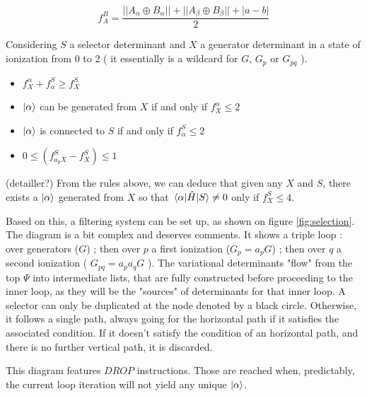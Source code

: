 \documentclass[./thesis.tex]{subfiles}
\begin{document}
\begin{equation}
f_A^B = \frac{||A_\alpha \oplus B_\alpha|| + ||A_\beta \oplus B_\beta|| + |a-b|}{2}
\end{equation}


Considering $S$ a selector determinant and $X$ a generator determinant in a state of ionization from 0 to 2 ( it essentially is a wildcard for $G$, $G_p$ or $G_{pq}$ ).

\begin{itemize}
\item
$f_X^\alpha + f_\alpha^S \geq f_X^S$
\item
$\ket \alpha$ can be generated from $X$ if and only if $f_X^\alpha \leq 2$
\item
$\ket \alpha$ is connected to $S$ if and only if $f_\alpha^S \leq 2$
\item
$0 \leq (f_{a_p X}^S - f_X^S) \leq 1$
\end{itemize}

(detailler?)
From the rules above, we can deduce that given any $X$ and $S$, there exists a $\ket \alpha$ generated from $X$ so that $\mel{\alpha}{\hat{H}}{S} \neq 0$ only if $f_X^S \leq 4$.

Based on this, a filtering system can be set up, as shown on figure \ref{fig:selection}.\\

The diagram is a bit complex and deserves comments. 
It shows a triple loop : over generators ($G$) ; then over $p$ a first ionization ($G_p = a_p G$) ; then over $q$ a second ionization ( $G_{pq} = a_p a_q G$ ). The variational determinants "flow" from the top $\Psi$ into intermediate lists, that are fully constructed before proceeding to the inner loop, as they will be the "sources" of determinants for that inner loop.
A selector can only be duplicated at the node denoted by a black circle. Otherwise, it follows a single path, always going for the horizontal path if it satisfies the associated condition.
If it doesn't satisfy the condition of an horizontal path, and there is no further vertical path, it is discarded.

This diagram features $DROP$ instructions. Those are reached when, predictably, the current loop iteration will not yield any unique $\ket \alpha$. 
\end{document}
